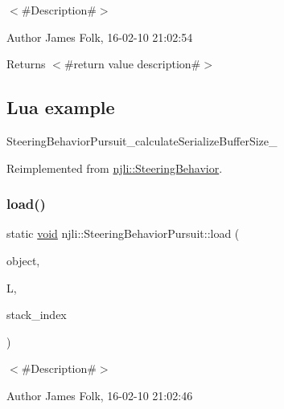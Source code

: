 $<$\#\+Description\#$>$ 

\begin{DoxyAuthor}{Author}
James Folk, 16-\/02-\/10 21\+:02\+:54
\end{DoxyAuthor}
\begin{DoxyReturn}{Returns}
$<$\#return value description\#$>$
\end{DoxyReturn}
\hypertarget{classnjli_1_1_steering_behavior_wander_ex1}{}\subsection{Lua example}\label{classnjli_1_1_steering_behavior_wander_ex1}

\begin{DoxyCodeInclude}
\end{DoxyCodeInclude}
Steering\+Behavior\+Pursuit\+\_\+calculate\+Serialize\+Buffer\+Size\+\_\+ 

Reimplemented from \mbox{\hyperlink{classnjli_1_1_steering_behavior_ae82bca8468d41aff8c22b76fd359fe9b}{njli\+::\+Steering\+Behavior}}.

\mbox{\label{classnjli_1_1_steering_behavior_pursuit_a6ca9631b6899e6b51e58d943535650cd}} 
\subsubsection{\texorpdfstring{load()}{load()}}
{\footnotesize\ttfamily static \mbox{\hyperlink{_thread_8h_af1e856da2e658414cb2456cb6f7ebc66}{void}} njli\+::\+Steering\+Behavior\+Pursuit\+::load (\begin{DoxyParamCaption}\item[{\mbox{\hyperlink{classnjli_1_1_steering_behavior_pursuit}{Steering\+Behavior\+Pursuit}} \&}]{object,  }\item[{lua\+\_\+\+State $\ast$}]{L,  }\item[{int}]{stack\+\_\+index }\end{DoxyParamCaption})\hspace{0.3cm}{\ttfamily [static]}}



$<$\#\+Description\#$>$ 

\begin{DoxyAuthor}{Author}
James Folk, 16-\/02-\/10 21\+:02\+:46
\end{DoxyAuthor}

